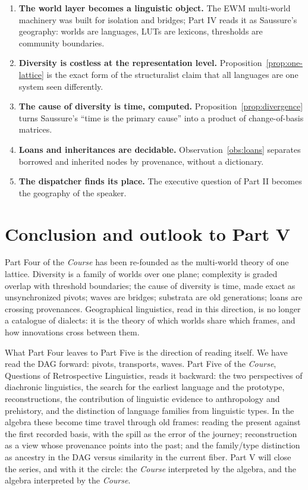 \documentclass[11pt,a4paper]{article}
\theoremstyle{remark}
\begin{document}
\begin{enumerate}[leftmargin=*,nosep]
  \item \textbf{The world layer becomes a linguistic object.} The EWM
    multi-world machinery \cite{companion2026} was built for isolation and
    bridges; Part IV reads it as Saussure's geography: worlds are languages,
    LUTs are lexicons, thresholds are community boundaries.
  \item \textbf{Diversity is costless at the representation level.}
    Proposition~\ref{prop:one-lattice} is the exact form of the
    structuralist claim that all languages are one system seen differently.
  \item \textbf{The cause of diversity is time, computed.}
    Proposition~\ref{prop:divergence} turns Saussure's ``time is the primary
    cause'' into a product of change-of-basis matrices.
  \item \textbf{Loans and inheritances are decidable.}
    Observation~\ref{obs:loans} separates borrowed and inherited nodes by
    provenance, without a dictionary.
  \item \textbf{The dispatcher finds its place.} The executive question of
    Part II becomes the geography of the speaker.
\end{enumerate}

\section{Conclusion and outlook to Part V}
\label{sec:conclusion}

Part Four of the \textit{Course} has been re-founded as the multi-world
theory of one lattice. Diversity is a family of worlds over one plane;
complexity is graded overlap with threshold boundaries; the cause of
diversity is time, made exact as unsynchronized pivots; waves are bridges;
substrata are old generations; loans are crossing provenances. Geographical
linguistics, read in this direction, is no longer a catalogue of dialects: it
is the theory of which worlds share which frames, and how innovations cross
between them.

What Part Four leaves to Part Five is the direction of reading itself. We
have read the DAG forward: pivots, transports, waves. Part Five of the
\textit{Course}, Questions of Retrospective Linguistics, reads it backward:
the two perspectives of diachronic linguistics, the search for the earliest
language and the prototype, reconstructions, the contribution of linguistic
evidence to anthropology and prehistory, and the distinction of language
families from linguistic types. In the algebra these become time travel
through old frames: reading the present against the first recorded basis,
with the spill as the error of the journey; reconstruction as a view whose
provenance points into the past; and the family/type distinction as ancestry
in the DAG versus similarity in the current fiber. Part V will close the
series, and with it the circle: the \textit{Course} interpreted by the
algebra, and the algebra interpreted by the \textit{Course}.
\end{document}
